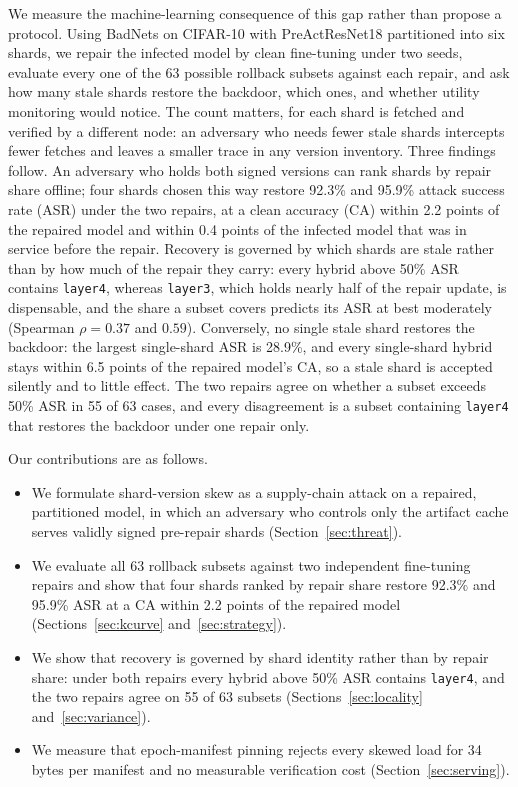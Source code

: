\documentclass[conference,a4paper]{IEEEtran}  %
\newcommand{\todo}[1]{\textcolor{red}{[TODO: #1]}}
\newif\ifincludeanp      \includeanpfalse   %
\begin{document}
We measure the machine-learning consequence of this gap rather than propose a
protocol. Using BadNets on CIFAR-10 with PreActResNet18 partitioned into six
shards, we repair the infected model by clean fine-tuning under two seeds,
evaluate every one of the 63 possible rollback subsets against each repair, and
ask how many stale shards restore the backdoor, which ones, and whether
utility monitoring would notice. The count matters, for each shard is fetched
and verified by a different node: an adversary who needs fewer stale shards
intercepts fewer fetches and leaves a smaller trace in any version inventory.
Three findings follow. An adversary who holds both signed versions can rank
shards by repair share offline; four shards chosen this way restore 92.3\% and
95.9\% attack success rate (ASR) under the two repairs, at a clean accuracy
(CA) within 2.2 points of the repaired model and within 0.4 points of the
infected model that was in service before the repair. Recovery is governed by
which shards are stale rather than by how much of the repair they carry: every
hybrid above 50\% ASR contains \texttt{layer4}, whereas \texttt{layer3}, which
holds nearly half of the repair update, is dispensable, and the share a subset
covers predicts its ASR at best moderately (Spearman $\rho = 0.37$ and $0.59$).
Conversely, no single stale shard restores the backdoor: the largest
single-shard ASR is 28.9\%, and every single-shard hybrid stays within 6.5
points of the repaired model's CA, so a stale shard is accepted silently and to
little effect. The two repairs agree on whether a subset exceeds 50\% ASR in 55
of 63 cases, and every disagreement is a subset containing \texttt{layer4} that
restores the backdoor under one repair only.
\ifincludeanp
\todo{One sentence on ANP, from measured numbers only.}
\fi
\noindent Our contributions are as follows.
\begin{itemize}
\item We formulate shard-version skew as a supply-chain attack on a repaired, partitioned model, in which an adversary who controls only the artifact cache serves validly signed pre-repair shards (Section~\ref{sec:threat}).
\item We evaluate all 63 rollback subsets against two independent fine-tuning repairs and show that four shards ranked by repair share restore 92.3\% and 95.9\% ASR at a CA within 2.2 points of the repaired model (Sections~\ref{sec:kcurve} and~\ref{sec:strategy}).
\item We show that recovery is governed by shard identity rather than by repair share: under both repairs every hybrid above 50\% ASR contains \texttt{layer4}, and the two repairs agree on 55 of 63 subsets (Sections~\ref{sec:locality} and~\ref{sec:variance}).
\item We measure that epoch-manifest pinning rejects every skewed load for 34 bytes per manifest and no measurable verification cost (Section~\ref{sec:serving}).
\end{itemize}
\end{document}
